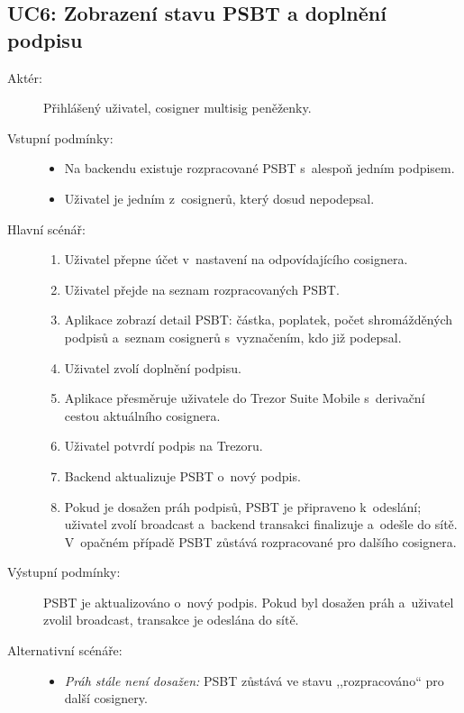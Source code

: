 \subsection{UC6: Zobrazení stavu PSBT a doplnění podpisu}
\label{uc:psbt-status}

\begin{description}
  \item[Aktér:] Přihlášený uživatel, cosigner multisig peněženky.
  \item[Vstupní podmínky:] \hfill
    \begin{itemize}
      \item Na backendu existuje rozpracované PSBT s~alespoň jedním podpisem.
      \item Uživatel je jedním z~cosignerů, který dosud nepodepsal.
    \end{itemize}
  \item[Hlavní scénář:] \hfill
    \begin{enumerate}
      \item Uživatel přepne účet v~nastavení na odpovídajícího cosignera.
      \item Uživatel přejde na seznam rozpracovaných PSBT.
      \item Aplikace zobrazí detail PSBT: částka, poplatek, počet shromážděných
            podpisů a~seznam cosignerů s~vyznačením, kdo již podepsal.
      \item Uživatel zvolí doplnění podpisu.
      \item Aplikace přesměruje uživatele do Trezor Suite Mobile s~derivační cestou
            aktuálního cosignera.
      \item Uživatel potvrdí podpis na Trezoru.
      \item Backend aktualizuje PSBT o~nový podpis.
      \item Pokud je dosažen práh podpisů, PSBT je připraveno k~odeslání;
            uživatel zvolí broadcast a~backend transakci finalizuje a~odešle
            do sítě. V~opačném případě PSBT zůstává rozpracované pro dalšího
            cosignera.
    \end{enumerate}
  \item[Výstupní podmínky:] PSBT je aktualizováno o~nový podpis. Pokud byl dosažen
    práh a~uživatel zvolil broadcast, transakce je odeslána do sítě.
  \item[Alternativní scénáře:] \hfill
    \begin{itemize}
      \item \emph{Práh stále není dosažen:} PSBT zůstává ve stavu ,,rozpracováno``
            pro další cosignery.
    \end{itemize}
\end{description}

